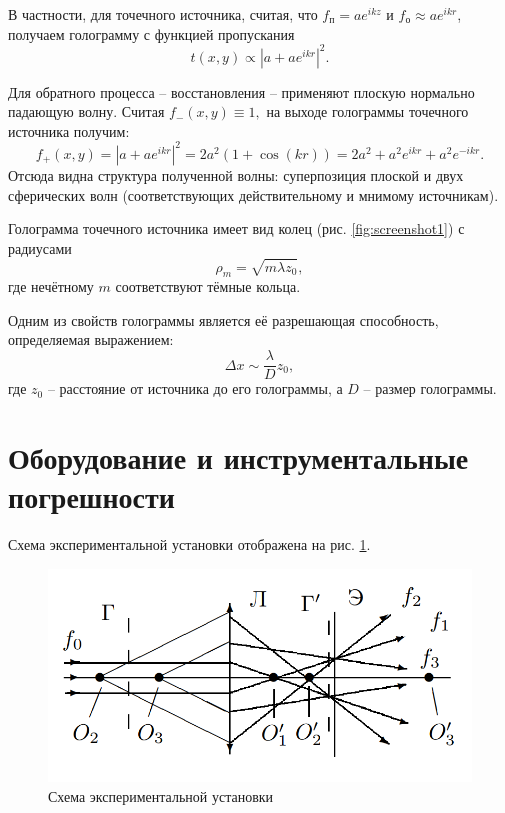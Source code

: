 \documentclass[a4paper]{article}
\begin{document}
В частности, для точечного источника, считая, что $ f_п = a e^{i k z}  $ и $ f_о \approx a e^{i k r} $, получаем голограмму  с функцией пропускания
\begin{equation*}\label{key}
	t(x, y) \propto \left| a+ a e^{i k r}\right|^2.
\end{equation*}

Для обратного процесса -- восстановления -- применяют плоскую нормально падающую волну. Считая $ f_- (x, y) \equiv 1, $ на выходе голограммы точечного источника получим:
\begin{equation*}\label{key}
	f_+ (x, y) = \left| a+ a e^{i k r}\right|^2 = 2 a^2 (1+\cos (k r)) = 2 a^2 + a^2 e^{i k r} +a^2 e^{- i k r}.
\end{equation*}
Отсюда видна структура полученной волны: суперпозиция плоской и двух сферических волн (соответствующих действительному и мнимому источникам).

Голограмма точечного источника имеет вид колец (рис. \ref{fig:screenshot1}) с радиусами
\begin{equation*}\label{key}
	\rho_m = \sqrt{m \lambda z_0},
\end{equation*}
где нечётному $ m $ соответствуют тёмные кольца.

Одним из свойств голограммы является её разрешающая способность, определяемая выражением:
\begin{equation*}\label{key}
	\Delta x \sim \frac{\lambda}{D} z_0,
\end{equation*}
где $ z_0 $ -- расстояние от источника до его голограммы, а $ D $ -- размер голограммы.

\section{Оборудование и инструментальные погрешности}

Схема экспериментальной установки отображена на рис. \ref{fig:screenshot2}.

\begin{figure}[tbp]
	\centering
	\includegraphics[width=0.8\linewidth]{Screenshot_2}
	\caption{Схема экспериментальной установки}
	\label{fig:screenshot2}
\end{figure}
\end{document}
